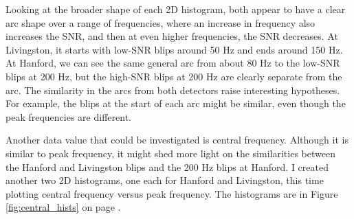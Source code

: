 \documentclass[a4paper]{article}
\begin{document}
Looking at the broader shape of each 2D histogram, both appear to have a clear arc shape over a range of frequencies, where an increase in frequency also increases the SNR, and then at even higher frequencies, the SNR decreases. At Livingston, it starts with low-SNR blips around 50 Hz and ends around 150 Hz. At Hanford, we can see the same general arc from about 80 Hz to the low-SNR blips at 200 Hz, but the high-SNR blips at 200 Hz are clearly separate from the arc. The similarity in the arcs from both detectors raise interesting hypotheses. For example, the blips at the start of each arc might be similar, even though the peak frequencies are different. 

Another data value that could be investigated is central frequency. Although it is similar to peak frequency, it might shed more light on the similarities between the Hanford and Livingston blips and the 200 Hz blips at Hanford. I created another two 2D histograms, one each for Hanford and Livingston, this time plotting central frequency versus peak frequency. The histograms are in Figure \ref{fig:central_hists} on page \pageref{fig:central_hists}.
\end{document}
